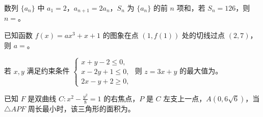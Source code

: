 \begin{question}
数列 $\{a_n\}$ 中 $a_1=2$，$a_{n+1}=2a_n$，$S_n$ 为 $\{a_n\}$ 的前 $n$ 项和，若 $S_n=126$，则 $n=$\gkblank{}。

\end{question}
\begin{question}
已知函数 $f(x)=ax^3+x+1$ 的图象在点 $(1,f(1))$ 处的切线过点 $(2,7)$，则 $a=$\gkblank{}。

\end{question}
\begin{question}
若 $x,y$ 满足约束条件 $\begin{cases}x+y-2\leqslant0,\\x-2y+1\leqslant0,\\2x-y+2\geqslant0,\end{cases}$ 则 $z=3x+y$ 的最大值为\gkblank{}。

\end{question}
\begin{question}
已知 $F$ 是双曲线 $C:x^2-\frac{y^2}{8}=1$ 的右焦点，$P$ 是 $C$ 左支上一点，$A(0,6\sqrt6)$，当 $\triangle APF$ 周长最小时，该三角形的面积为\gkblank{}。

\end{question}

